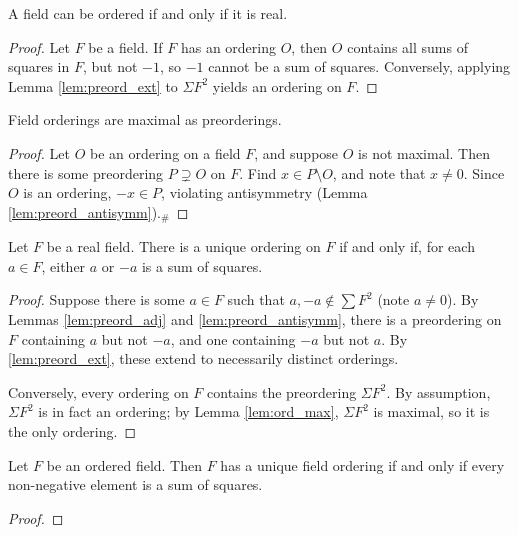 \begin{theorem}
  \label{thm:ord_iff_real}
  \leanok
  A field can be ordered if and only if it is real.
\end{theorem}
\begin{proof}
  \leanok
  Let $F$ be a field. If $F$ has an ordering $O$, then $O$ contains all sums of squares in $F$, but not $-1$, so $-1$ cannot be a sum of squares. Conversely, applying Lemma \ref{lem:preord_ext} to $\Sigma F^2$ yields an ordering on $F$.
\end{proof}

\begin{lemma}
  \label{lem:ord_max}
  \leanok
  Field orderings are maximal as preorderings.
\end{lemma}
\begin{proof}
  \leanok
  Let $O$ be an ordering on a field $F$, and suppose $O$ is not maximal. Then there is some preordering $P\supsetneq O$ on $F$. Find $x\in P\setminus O$, and note that $x\neq0$. Since $O$ is an ordering, $-x\in P$, violating antisymmetry (Lemma \ref{lem:preord_antisymm}).$_\#$
\end{proof}

\begin{lemma}
  \label{lem:unique_ord_cond}
  \leanok
  Let $F$ be a real field. There is a unique ordering on $F$ if and only if, for each $a\in F$, either $a$ or $-a$ is a sum of squares.
\end{lemma}
\begin{proof}
  \leanok
  Suppose there is some $a\in F$ such that $a,-a\notin\sum F^2$ (note $a\neq0$). By Lemmas \ref{lem:preord_adj} and \ref{lem:preord_antisymm}, there is a preordering on $F$ containing $a$ but not $-a$, and one containing $-a$ but not $a$. By \ref{lem:preord_ext}, these extend to necessarily distinct orderings.

  Conversely, every ordering on $F$ contains the preordering $\Sigma F^2$. By assumption, $\Sigma F^2$ is in fact an ordering; by Lemma \ref{lem:ord_max}, $\Sigma F^2$ is maximal, so it is the only ordering.
\end{proof}

\begin{corollary}
  \label{cor:unique_ord_cond_ordered}
  \leanok
  Let $F$ be an ordered field. Then $F$ has a unique field ordering if and only if every non-negative element is a sum of squares.
\end{corollary}
\begin{proof}
  \leanok
\end{proof}

